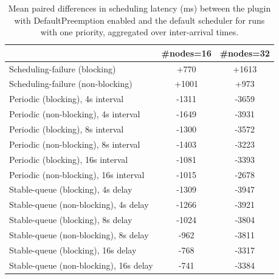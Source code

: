\begin{table}[t]
\tiny
\setlength{\tabcolsep}{1.2pt}
\renewcommand{\arraystretch}{1.12}
\centering
\caption{Mean paired differences in scheduling latency (ms) between the plugin with DefaultPreemption enabled and the default scheduler for runs with one priority, aggregated over inter-arrival times.}
\label{tab:latency-defpreempt1-prio1-std0-agg-arrival}
\begin{tabular}{l c c}
\toprule
 & \#nodes=16 & \#nodes=32 \\
\midrule
Scheduling-failure (blocking) & +770 & +1613 \\
Scheduling-failure (non-blocking) & +1001 & +973 \\
Periodic (blocking), 4s interval & -1311 & -3659 \\
Periodic (non-blocking), 4s interval & -1649 & -3931 \\
Periodic (blocking), 8s interval & -1300 & -3572 \\
Periodic (non-blocking), 8s interval & -1403 & -3223 \\
Periodic (blocking), 16s interval & -1081 & -3393 \\
Periodic (non-blocking), 16s interval & -1015 & -2678 \\
Stable-queue (blocking), 4s delay & -1309 & -3947 \\
Stable-queue (non-blocking), 4s delay & -1266 & -3921 \\
Stable-queue (blocking), 8s delay & -1024 & -3804 \\
Stable-queue (non-blocking), 8s delay & -962 & -3811 \\
Stable-queue (blocking), 16s delay & -768 & -3317 \\
Stable-queue (non-blocking), 16s delay & -741 & -3384 \\
\bottomrule
\end{tabular}
\end{table}
